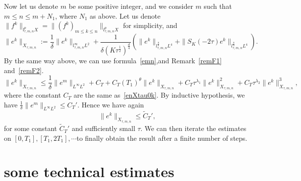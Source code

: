 \documentclass[10pt,a4paper]{article}
\begin{document}
  Now let us denote \(m\) be some positive integer, and we consider \(m\) such
  that \( m \leq n \leq m+N_1\), where \(N_1\) as above.
  Let us denote 
  \( \|f^k\|_{l^p_{\tau,m,n}X} = \|(f^k)_{m\leq k\leq n}\|_{l^p_{\tau,m,n}X} \)
  for simplicity, and 
  \[
      \|e^k\|_{X_{\tau,m,n}} := \frac1\delta \|e^k\|_{l^\infty_{\tau,m,n}L^2} 
      + \frac1{\delta(K\tau^\frac12)^\frac d4} \left(\|e^k\|_{l^\frac8d_{\tau,m,n}L^4}
      + \|S_K(-2\tau)e^k\|_{l^\frac8d_{\tau,m,n}L^4}\right).
  \]
  By the same way above, we can use formula~\eqref{emn},and Remark~\ref{remF1}
  and~\ref{remF2}. 
  \begin{equation}\label{enXtaumn}
    \|e^k\|_{X_{\tau,m,n}} \leq \frac1\delta \|e^m\|_{L^\infty L^2} + C_T + C_T (T_1)^{\theta}
    \|e^k\|_{X_{\tau,m,n}} + C_T \tau^{\lambda_1} \|e^k\|_{X_{\tau,m,n}}^2 
    + C_T \tau^{\lambda_2} \|e^k\|_{X_{\tau,m,n}}^3,
  \end{equation}
  where the constant \(C_T\) are the same as~\eqref{enXtau0k}.
  By inductive hypothesis, we have \( \frac1\delta \|e^m\|_{L^\infty L^2} \leq C_T'\).
  Hence we have again 
  \[ \|e^k\|_{X_{\tau,m,n}} \leq \widetilde C_T', \]
  for some constant \(\widetilde C_T'\) and sufficiently small \(\tau\).
  We can then iterate the estimates on \([0,T_1],[T_1,2T_1],\cdots\)to finally
  obtain the result after a finite number of steps.


  \section{some technical estimates}
\end{document}
